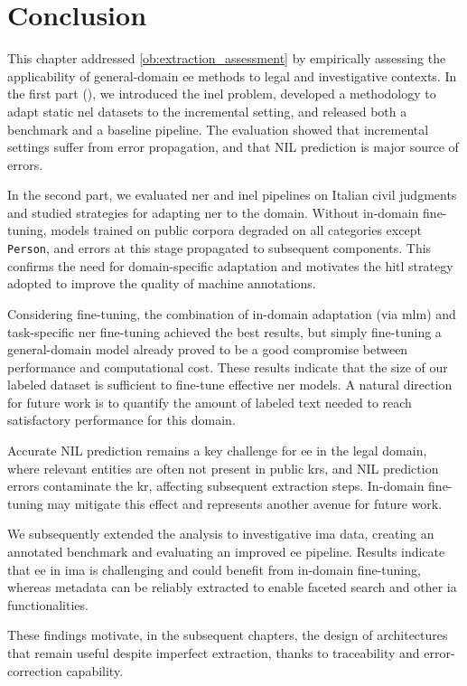 \FloatBarrier
\section{Conclusion}
\label{sec:ee:conclusion}

This chapter addressed \ref{ob:extraction_assessment} by empirically assessing the applicability of general-domain \ac{ee} methods to legal and investigative contexts. In the first part (), we introduced the \acf{inel} problem, developed a methodology to adapt static \acf{nel} datasets to the incremental setting, and released both a benchmark and a baseline pipeline. The evaluation showed that incremental settings suffer from error propagation, and that NIL prediction is major source of errors.


In the second part, we evaluated \acf{ner} and \ac{inel} pipelines on Italian civil judgments and studied strategies for adapting \ac{ner} to the domain. Without in-domain fine-tuning, models trained on public corpora degraded on all categories except \texttt{Person}, and errors at this stage propagated to subsequent components. This confirms the need for domain-specific adaptation and motivates the \acl{hitl} strategy adopted to improve the quality of machine annotations.

Considering fine-tuning, the combination of in-domain adaptation (via \acl{mlm}) and task-specific \ac{ner} fine-tuning achieved the best results, but simply fine-tuning a general-domain model already proved to be a good compromise between performance and computational cost. These results indicate that the size of our labeled dataset is sufficient to fine-tune effective \ac{ner} models. A natural direction for future work is to quantify the amount of labeled text needed to reach satisfactory performance for this domain.

Accurate NIL prediction remains a key challenge for \acf{ee} in the legal domain, where relevant entities are often not present in public \acfp{kr}, and NIL prediction errors contaminate the \ac{kr}, affecting subsequent extraction steps.
In-domain fine-tuning may mitigate this effect and represents another avenue for future work.

We subsequently extended the analysis to investigative \ac{ima} data, creating an annotated benchmark and evaluating an improved \ac{ee} pipeline. Results indicate that \acl{ee} in \ac{ima} is challenging and could benefit from in-domain fine-tuning, whereas metadata can be reliably extracted to enable faceted search and other \acl{ia} functionalities.

These findings motivate, in the subsequent chapters, the design of architectures that remain useful despite imperfect extraction, thanks to traceability and error-correction capability.
